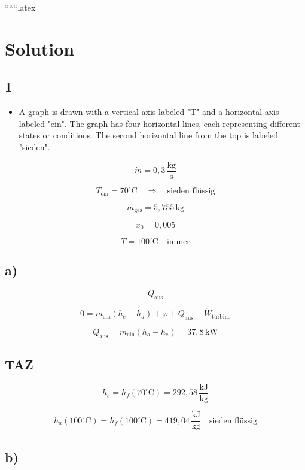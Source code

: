 
``````latex


\section*{Solution}

\subsection*{1}

\begin{itemize}
    \item A graph is drawn with a vertical axis labeled "T" and a horizontal axis labeled "ein". The graph has four horizontal lines, each representing different states or conditions. The second horizontal line from the top is labeled "sieden".
\end{itemize}

\[
\dot{m} = 0{,}3 \, \frac{\text{kg}}{\text{s}}
\]

\[
T_{\text{ein}} = 70^\circ \text{C} \quad \Rightarrow \quad \text{sieden flüssig}
\]

\[
m_{\text{ges}} = 5{,}755 \, \text{kg}
\]

\[
x_0 = 0{,}005
\]

\[
T = 100^\circ \text{C} \quad \text{immer}
\]

\subsection*{a)}

\[
Q_{\text{aus}}
\]

\[
0 = \dot{m}_{\text{ein}} \left( h_e - h_a \right) + \dot{\varphi} + Q_{\text{aus}} - \dot{W}_{\text{turbine}}
\]

\[
Q_{\text{aus}} = \dot{m}_{\text{ein}} \left( h_a - h_e \right) = 37{,}8 \, \text{kW}
\]

\subsection*{TAZ}

\[
h_e = h_f (70^\circ \text{C}) = 292{,}58 \, \frac{\text{kJ}}{\text{kg}}
\]

\[
h_{a} (100^\circ \text{C}) = h_f (100^\circ \text{C}) = 419{,}04 \, \frac{\text{kJ}}{\text{kg}} \quad \text{sieden flüssig}
\]

\subsection*{b)}

